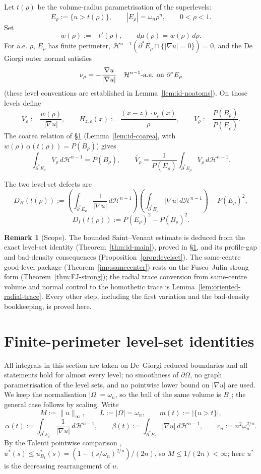 \documentclass[11pt]{amsart}
\theoremstyle{definition}
\newtheorem{remark}[theorem]{Remark}
\newcommand{\Om}{\Omega}
\newcommand{\wt}{w}
\newcommand{\Hn}{\mathcal H^{n-1}}
\newcommand{\Per}{P}
\begin{document}
Let \(t(\rho)\) be the volume-radius parametrisation of the superlevels:
\[
   E_\rho:=\{u>t(\rho)\},\qquad |E_\rho|=\omega_n\rho^n,
   \qquad 0<\rho<1.
\]
Set
\[
   \wt(\rho):=-t'(\rho),\qquad d\mu(\rho)=\wt(\rho)\,d\rho.
\]
For a.e. \(\rho\), \(E_\rho\) has finite perimeter, \(\Hn(\partial^*E_\rho
\cap\{|\nabla u|=0\})=0\), and the De Giorgi outer normal satisfies
\[
   \nu_\rho=-\frac{\nabla u}{|\nabla u|}
   \quad\Hn\hbox{-a.e. on }\partial^*E_\rho
\]
(these level conventions are established in
Lemma~\ref{lem:id-noatoms}).  On those levels define
\[
   V_\rho:=\frac{\wt(\rho)}{|\nabla u|},\qquad
   H_{z,\rho}(x):=\frac{(x-z)\cdot\nu_\rho(x)}{\rho},\qquad
   \bar V_\rho:=\frac{\Per(B_\rho)}{\Per(E_\rho)}.
\]
The coarea relation of \S\ref{sec:identity}
(Lemma~\ref{lem:id-coarea}, with \(\wt(\rho)\,\alpha(t(\rho))=\Per(B_\rho)\))
gives
\begin{equation}\label{eq:V-mean}
   \int_{\partial^*E_\rho} V_\rho\,d\Hn=\Per(B_\rho),
   \qquad
   \bar V_\rho=\frac1{\Per(E_\rho)}
       \int_{\partial^*E_\rho}V_\rho\,d\Hn .
\end{equation}

The two level-set defects are
\[
   D_H(t(\rho))
   :=\left(\int_{\partial^*E_\rho}\frac1{|\nabla u|}\,d\Hn\right)
     \left(\int_{\partial^*E_\rho}|\nabla u|\,d\Hn\right)
      -\Per(E_\rho)^2,
\]
\[
   D_I(t(\rho)):=\Per(E_\rho)^2-\Per(B_\rho)^2 .
\]

\begin{remark}[Scope]\label{rem:scope}
The bounded Saint--Venant estimate is deduced from the exact level-set
identity (Theorem~\ref{thm:id-main}), proved in \S\ref{sec:identity}, and its
profile-gap and bad-density consequences (Proposition~\ref{prop:levelset}).
The same-centre good-level package (Theorem~\ref{inp:samecenter}) rests on the
Fusco--Julin strong form (Theorem~\ref{thm:FJ-strong});
the radial trace conversion from same-centre volume and normal control to the
homothetic trace is Lemma~\ref{lem:oriented-radial-trace}.  Every other step,
including the first variation and the bad-density bookkeeping, is proved here.
\end{remark}

\section{Finite-perimeter level-set identities}\label{sec:identity}

All integrals in this section are taken on De~Giorgi reduced boundaries and all
statements hold for almost every level; no smoothness of \(\partial\Om\), no
graph parametrisation of the level sets, and no pointwise lower bound on
\(|\nabla u|\) are used.  We keep the normalisation \(|\Om|=\omega_n\), so the
ball of the same volume is \(B_1\); the general case follows by scaling.  Write
\[
   M:=\|u\|_\infty,\qquad L:=|\Om|=\omega_n,\qquad
   m(t):=|\{u>t\}|,
\]
\[
   \alpha(t):=\int_{\partial^*E_t}\frac1{|\nabla u|}\,d\Hn,\qquad
   \beta(t):=\int_{\partial^*E_t}|\nabla u|\,d\Hn,\qquad
   c_n:=n^2\omega_n^{2/n}.
\]
By the Talenti pointwise comparison \cite{Talenti1976},
\(u^*(s)\le u_{B_1}^*(s)=(1-(s/\omega_n)^{2/n})/(2n)\), so
\(M\le 1/(2n)<\infty\); here \(u^*\) is the decreasing rearrangement of \(u\).
\end{document}
